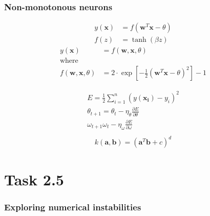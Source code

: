 \documentclass{beamer}
\begin{document}
\begin{frame}
	\frametitle{Non-monotonous neurons}
	\begin{align*}
		y(\mathbf{x}) &= f(\mathbf{w}^T\mathbf{x}-\theta)\\
		f(z) &= \tanh(\beta z)
	\end{align*}
	\begin{align*}
		y(\mathbf{x})&= f(\mathbf{w},\mathbf{x},\theta)\\
		\text{where }\\
		f(\mathbf{w},\mathbf{x},\theta) &= 2\cdot\exp\left[-\frac{1}{2}(\mathbf{w}^T\mathbf{x}-\theta)^2\right]-1
	\end{align*}
\end{frame}
\begin{frame}
	\begin{align*}
	E = \frac{1}{2}\sum_{i=1}^{n}(y(\mathbf{x_i})-y_i)^2\\
	\theta_{t+1} = \theta_{t} - \eta_\theta \frac{\partial E}{\partial \theta}\\
	\omega_{t+1} \omega_{t} - \eta_\omega \frac{\partial E}{\partial \omega}\\
	\end{align*}
	\begin{align*}
		k(\mathbf{a},\mathbf{b}) = (\mathbf{a}^T\mathbf{b}+c)^d
	\end{align*}
\end{frame}

\section{Task 2.5}
\begin{frame}
	\frametitle{Exploring numerical instabilities}
\end{frame}


%
%

\end{document}
